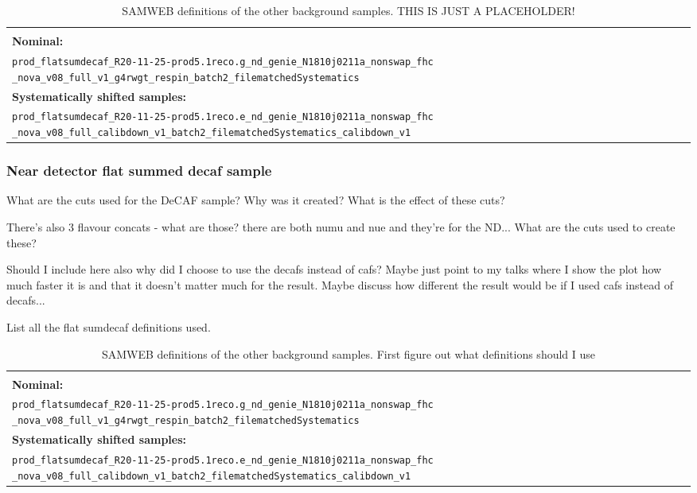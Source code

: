 \begin{table}[!ht]
\centering
\begin{tabular}{p{\textwidth}}
\hline\hline\\
\textbf{Nominal:}\\
\texttt{prod\_flatsumdecaf\_R20-11-25-prod5.1reco.g\_nd\_genie\_N1810j0211a\_nonswap\_fhc} \texttt{\_nova\_v08\_full\_v1\_g4rwgt\_respin\_batch2\_filematchedSystematics}\\[2mm]
\textbf{Systematically shifted samples:}\\
\texttt{prod\_flatsumdecaf\_R20-11-25-prod5.1reco.e\_nd\_genie\_N1810j0211a\_nonswap\_fhc} \texttt{\_nova\_v08\_full\_calibdown\_v1\_batch2\_filematchedSystematics\_calibdown\_v1}\\[2mm]
\hline\hline
\end{tabular}
\caption{SAMWEB definitions of the other background samples. THIS IS JUST A PLACEHOLDER!}
\label{tab:NueCCMECDefinitions}
\end{table}

\subsubsection*{Near detector flat summed decaf sample}
What are the cuts used for the DeCAF sample? Why was it created? What is the effect of these cuts?

There's also 3 flavour concats - what are those? there are both numu and nue and they're for the ND... What are the cuts used to create these?

Should I include here also why did I choose to use the decafs instead of cafs? Maybe just point to my talks where I show the plot how much faster it is and that it doesn't matter much for the result. Maybe discuss how different the result would be if I used cafs instead of decafs...

List all the flat sumdecaf definitions used.
\begin{table}[!ht]
\centering
\begin{tabular}{p{\textwidth}}
\hline\hline\\
\textbf{Nominal:}\\
\texttt{prod\_flatsumdecaf\_R20-11-25-prod5.1reco.g\_nd\_genie\_N1810j0211a\_nonswap\_fhc} \texttt{\_nova\_v08\_full\_v1\_g4rwgt\_respin\_batch2\_filematchedSystematics}\\[2mm]
\textbf{Systematically shifted samples:}\\
\texttt{prod\_flatsumdecaf\_R20-11-25-prod5.1reco.e\_nd\_genie\_N1810j0211a\_nonswap\_fhc} \texttt{\_nova\_v08\_full\_calibdown\_v1\_batch2\_filematchedSystematics\_calibdown\_v1}\\[2mm]
\hline\hline
\end{tabular}
\caption{SAMWEB definitions of the other background samples. First figure out what definitions should I use}
\label{tab:SumDeCAFDefinitions}
\end{table}

